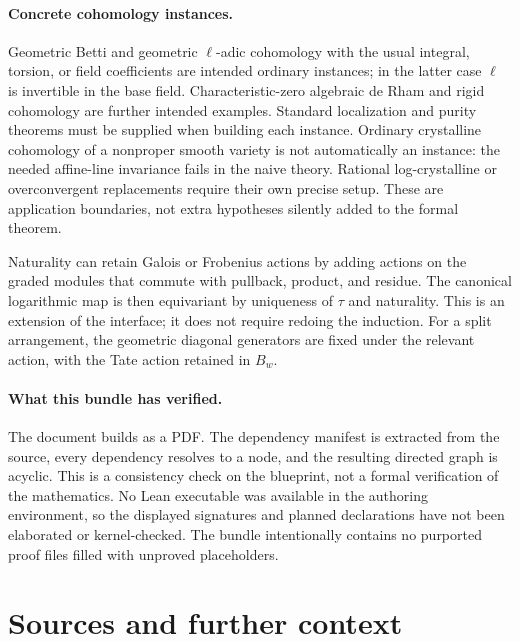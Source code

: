 \documentclass[11pt]{article}
\theoremstyle{definition}
\theoremstyle{remark}
\begin{document}
\paragraph{Concrete cohomology instances.}
Geometric Betti and geometric \(\ell\)-adic cohomology with the usual integral, torsion, or field coefficients are intended ordinary instances; in the latter case $\ell$ is invertible in the base field. Characteristic-zero algebraic de Rham and rigid cohomology are further intended examples. Standard localization and purity theorems must be supplied when building each instance. Ordinary crystalline cohomology of a nonproper smooth variety is not automatically an instance: the needed affine-line invariance fails in the naive theory. Rational log-crystalline or overconvergent replacements require their own precise setup. These are application boundaries, not extra hypotheses silently added to the formal theorem.

Naturality can retain Galois or Frobenius actions by adding actions on the graded modules that commute with pullback, product, and residue. The canonical logarithmic map is then equivariant by uniqueness of $\tau$ and naturality. This is an extension of the interface; it does not require redoing the induction. For a split arrangement, the geometric diagonal generators are fixed under the relevant action, with the Tate action retained in $B_w$.

\paragraph{What this bundle has verified.}
The document builds as a PDF. The dependency manifest is extracted from the source, every dependency resolves to a node, and the resulting directed graph is acyclic. This is a consistency check on the blueprint, not a formal verification of the mathematics. No Lean executable was available in the authoring environment, so the displayed signatures and planned declarations have not been elaborated or kernel-checked. The bundle intentionally contains no purported proof files filled with unproved placeholders.

\section{Sources and further context}
\end{document}
